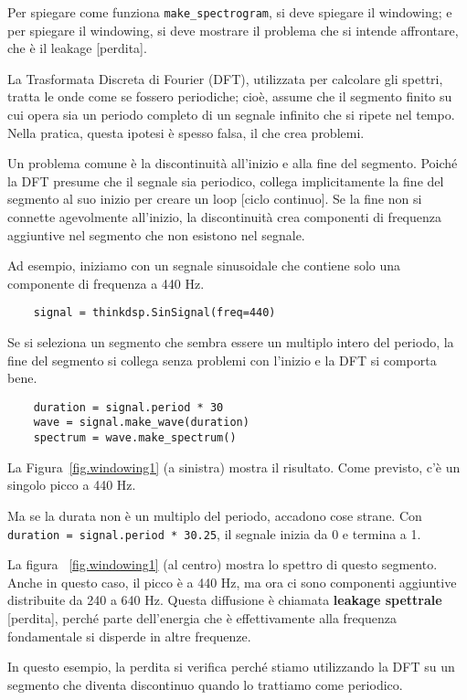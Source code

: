 \documentclass[12pt,a4paper]{book}
\begin{document}
Per spiegare come funziona \verb"make_spectrogram", si deve spiegare il windowing; e per spiegare il windowing, si deve mostrare il problema che si intende affrontare, che è il leakage [perdita].

La Trasformata Discreta di Fourier (DFT), utilizzata per calcolare gli spettri, tratta le onde come se fossero periodiche; cioè, assume che il segmento finito su cui opera sia un periodo completo di un segnale infinito che si ripete nel tempo. Nella pratica, questa ipotesi è spesso falsa, il che crea problemi.

Un problema comune è la discontinuità all'inizio e alla fine del segmento. Poiché la DFT presume che il segnale sia periodico, collega implicitamente la fine del segmento al suo inizio per creare un loop [ciclo continuo]. Se la fine non si connette agevolmente all'inizio, la discontinuità crea componenti di frequenza aggiuntive nel segmento che non esistono nel segnale.

Ad esempio, iniziamo con un segnale sinusoidale che contiene solo una componente di frequenza a 440 Hz.

\begin{verbatim} 
    signal = thinkdsp.SinSignal(freq=440)
 \end{verbatim} 

Se si seleziona un segmento che sembra essere un multiplo intero del periodo, la fine del segmento si collega senza problemi con l'inizio e la DFT si comporta bene.

\begin{verbatim} 
    duration = signal.period * 30
    wave = signal.make_wave(duration)
    spectrum = wave.make_spectrum()
 \end{verbatim} 

La Figura~\ref{fig.windowing1} (a sinistra) mostra il risultato. Come previsto, c'è un singolo picco a 440 Hz.

Ma se la durata non è un multiplo del periodo, accadono cose strane. Con {\tt duration = signal.period * 30.25}, il segnale inizia da 0 e termina a 1.

La figura ~\ref{fig.windowing1} (al centro) mostra lo spettro di questo segmento. Anche in questo caso, il picco è a 440 Hz, ma ora ci sono componenti aggiuntive distribuite da 240 a 640 Hz. Questa diffusione è chiamata {\bf leakage spettrale} [perdita], perché parte dell'energia che è effettivamente alla frequenza fondamentale si disperde in altre frequenze.

In questo esempio, la perdita si verifica perché stiamo utilizzando la DFT su un segmento che diventa discontinuo quando lo trattiamo come periodico.
\end{document}
